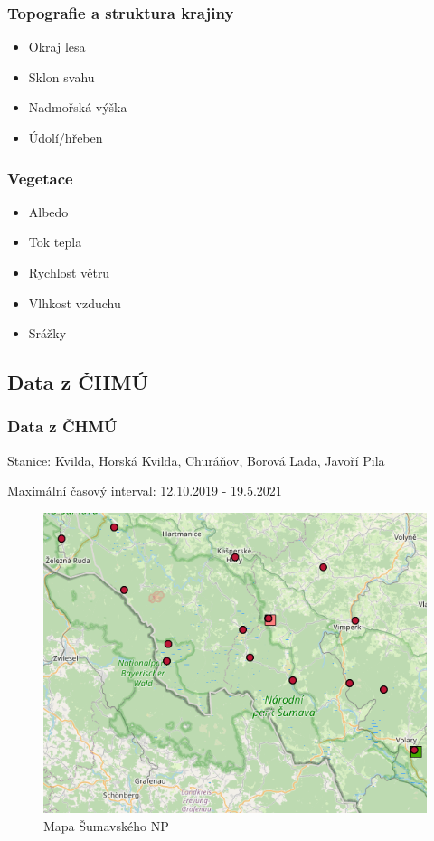 \documentclass[
	11pt, %
]{beamer}
\begin{document}
\begin{frame}
	\frametitle{Topografie a struktura krajiny}
	
	\begin{itemize}
		\item Okraj lesa
		\item Sklon svahu
		\item Nadmořská výška
		\item Údolí/hřeben
	\end{itemize}
	
	\bigskip %
	
\end{frame}

\begin{frame}
	\frametitle{Vegetace}
	\begin{itemize}
		\item Albedo
		\item Tok tepla
		\item Rychlost větru
		\item Vlhkost vzduchu
		\item Srážky
	\end{itemize}
\end{frame}


\subsection{Data z ČHMÚ}

\begin{frame}
	\frametitle{Data z ČHMÚ}
	Stanice: Kvilda, Horská Kvilda, Churáňov, Borová Lada, Javoří Pila

	Maximální časový interval: 12.10.2019 - 19.5.2021
	\begin{figure}
		\includegraphics[width=0.6\linewidth]{chmu_stations.png}
		\caption{Mapa Šumavského NP}
	\end{figure}
\end{frame}
\end{document}
